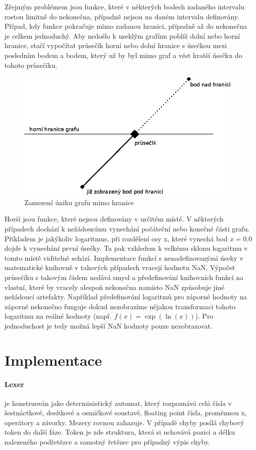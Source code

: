 \documentclass[11pt]{article}
\begin{document}
\clearpage
Zřejmým problémem jsou funkce, které v některých bodech zadaného intervalu
rostou limitně do nekonečna, případně nejsou na daném intervalu definovány.
Případ, kdy funkce pokračuje mimo zadanou hranici, případně až do nekonečna je
celkem jednoduchý. Aby nedošlo k useklým grafům poblíž dolní nebo horní
hranice, stačí vypočítat průsečík horní nebo dolní hranice s úsečkou mezi
posledním bodem a bodem, který už by byl mimo graf a vést kratší úsečku do
tohoto průsečíku. 
\begin{figure}[ht!]
\centering
	\includegraphics[width=11cm]{figures/boundary.eps}
	\caption{Zamezení úniku grafu mimo hranice}
\end{figure}

Horší jsou funkce, které nejsou definovány v určitém místě. V některých
případech dochází k nežádoucímu vynechání počáteční nebo konečné části grafu.
Příkladem je jakýkoliv logaritmus, při rozdělení osy x, které vynechá bod $x =
0.0$ dojde k vynechání první úsečky. Ta pak vzhledem k velkému sklonu logaritmu
v tomto místě viditelně schází. Implementace funkcí s nenadefinovanými úseky v
matematické knihovně v takových případech vracejí hodnotu NaN. Výpočet
průsečíku s takovým číslem nedává smysl a předefinování knihovních funkcí na
vlastní, které by vracely alespoň nekonečna namísto NaN způsobuje jiné
nežádoucí artefakty. Například předefinování logaritmů pro záporné hodnoty na
záporné nekonečno funguje dokud nezobrazíme nějakou transformaci tohoto
logaritmu na reálné hodnoty (např. $f(x) = \exp(\ln(x))$). Pro jednoduchost je
tedy možná lepší NaN hodnoty pouze nezobrazovat.


\section{Implementace}
\paragraph{Lexer} 
je konstruován jako deterministický automat, který rozpoznává celá čísla v
šestnáctkové, desítkové a osmičkové soustavě, floating point čísla, proměnnou
x, operátory a závorky. Mezery rovnou zahazuje. V případě chyby posílá chybový
token do další fáze.  Token je zde struktura, která si uchovává pozici a délku
nalezeného podřetězce a samotný řetězec pro případný výpis chyby.
\end{document}
